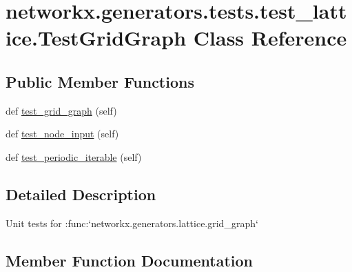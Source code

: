 \hypertarget{classnetworkx_1_1generators_1_1tests_1_1test__lattice_1_1TestGridGraph}{}\section{networkx.\+generators.\+tests.\+test\+\_\+lattice.\+Test\+Grid\+Graph Class Reference}
\label{classnetworkx_1_1generators_1_1tests_1_1test__lattice_1_1TestGridGraph}
\subsection*{Public Member Functions}
\begin{DoxyCompactItemize}
\item 
def \hyperlink{classnetworkx_1_1generators_1_1tests_1_1test__lattice_1_1TestGridGraph_a9fd325e22577160670a2dfe8c3bca1f0}{test\+\_\+grid\+\_\+graph} (self)
\item 
def \hyperlink{classnetworkx_1_1generators_1_1tests_1_1test__lattice_1_1TestGridGraph_a5a09c62a206844c56494a49f9e7da6af}{test\+\_\+node\+\_\+input} (self)
\item 
def \hyperlink{classnetworkx_1_1generators_1_1tests_1_1test__lattice_1_1TestGridGraph_a3f285802fca6550eeaa610b5d7b1b0d7}{test\+\_\+periodic\+\_\+iterable} (self)
\end{DoxyCompactItemize}


\subsection{Detailed Description}
\begin{DoxyVerb}Unit tests for :func:`networkx.generators.lattice.grid_graph`\end{DoxyVerb}
 

\subsection{Member Function Documentation}
\mbox{\label{classnetworkx_1_1generators_1_1tests_1_1test__lattice_1_1TestGridGraph_a9fd325e22577160670a2dfe8c3bca1f0}} 
